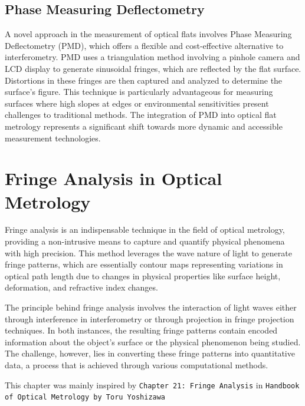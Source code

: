 \documentclass[../main.tex]{subfiles}
\begin{document}
\subsection{Phase Measuring Deflectometry}
\vspace{-15pt}
A novel approach in the measurement of optical flats involves Phase Measuring Deflectometry (PMD), which offers a flexible and cost-effective alternative to interferometry. PMD uses a triangulation method involving a pinhole camera and LCD display to generate sinusoidal fringes, which are reflected by the flat surface. Distortions in these fringes are then captured and analyzed to determine the surface's figure. This technique is particularly advantageous for measuring surfaces where high slopes at edges or environmental sensitivities present challenges to traditional methods. The integration of PMD into optical flat metrology represents a significant shift towards more dynamic and accessible measurement technologies. \cite{WOS:000385319500019}
\vspace{-15pt}
\section{Fringe Analysis in Optical Metrology}
\vspace{-15pt}
Fringe analysis is an indispensable technique in the field of optical metrology, providing a non-intrusive means to capture and quantify physical phenomena with high precision. This method leverages the wave nature of light to generate fringe patterns, which are essentially contour maps representing variations in optical path length due to changes in physical properties like surface height, deformation, and refractive index changes.

The principle behind fringe analysis involves the interaction of light waves either through interference in interferometry or through projection in fringe projection techniques. In both instances, the resulting fringe patterns contain encoded information about the object's surface or the physical phenomenon being studied. The challenge, however, lies in converting these fringe patterns into quantitative data, a process that is achieved through various computational methods.

This chapter was mainly inspired by \texttt{Chapter 21: Fringe Analysis} in \texttt{Handbook of Optical Metrology by Toru Yoshizawa} \cite{fringe_analysis}
\vspace{-15pt}
\end{document}
